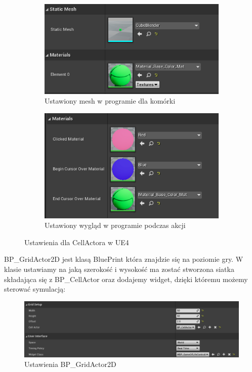 \documentclass[a4paper,12pt,reqno]{article}
\begin{document}
\begin{figure}[H]%
	\centering
	\begin{subfigure}{.45\textwidth}
		\centering
		\includegraphics[width=0.8\linewidth]{graphics/gameoflife/CellActorInUE_1.png}
		\caption{Ustawiony mesh w programie dla komórki}	
		\label{ref:subref_a}
	\end{subfigure}%
	\begin{subfigure}{.45\textwidth}
		\centering
		\includegraphics[width=0.8\linewidth]{graphics/gameoflife/CellActorInUE_2.png}
		\caption{Ustawiony wygląd w programie podczas akcji}
		\label{ref:subref_b}
	\end{subfigure}%
	

\caption{Ustawienia dla CellActora w UE4}
\label{ref:ref}
\end{figure}

BP\_GridActor2D jest klasą BluePrint która znajdzie się na poziomie gry. W klasie ustawiamy na jaką szerokość i wysokość ma zostać stworzona siatka składająca się z BP\_CellActor oraz dodajemy widget, dzięki któremu możemy sterować symulacją:

\begin{figure}[H]%
\centering
\includegraphics[width=0.7\columnwidth]{graphics/gameoflife/GridActor2DInUE_1.png}
\caption{Ustawienia BP\_GridActor2D 
\label{BPExample}}%
%
\qquad
\end{figure}  
\end{document}
